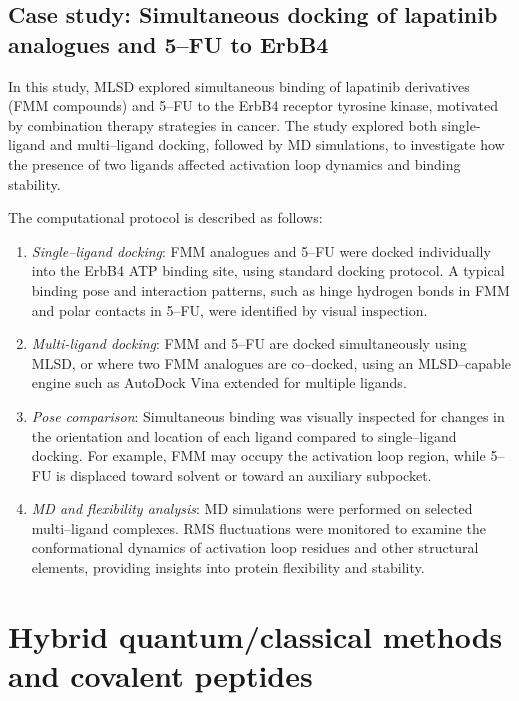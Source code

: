 \documentclass[12pt]{article}
\begin{document}
\subsection{Case study: Simultaneous docking of lapatinib analogues and 5–FU to ErbB4}

In this study, MLSD explored simultaneous binding of lapatinib derivatives (FMM compounds) and 5–FU to the ErbB4 receptor tyrosine kinase\cite{CH14_ErbB4MLSD2024}, motivated by combination therapy strategies in cancer.  The study explored both single-ligand and multi–ligand docking, followed by MD simulations, to investigate how the presence of two ligands affected activation loop dynamics and binding stability.

The computational protocol is described as follows:

\begin{enumerate}
  \item \emph{Single–ligand docking}: FMM analogues and 5–FU were docked individually into the ErbB4 ATP binding site, using standard docking protocol.  A typical binding pose and interaction patterns, such as hinge hydrogen bonds in FMM and polar contacts in 5–FU, were identified by visual inspection.
  \item \emph{Multi-ligand docking}:  FMM and 5–FU are docked simultaneously using MLSD, or where two FMM analogues are co–docked, using an MLSD–capable engine such as AutoDock Vina extended for multiple ligands.
  \item \emph{Pose comparison}: Simultaneous binding was visually inspected for changes in the orientation and location of each ligand compared to single–ligand docking.  For example, FMM may occupy the activation loop region, while 5–FU is displaced toward solvent or toward an auxiliary subpocket. 
  \item \emph{MD and flexibility analysis}: MD simulations were performed on selected multi–ligand complexes. RMS fluctuations were monitored to examine the conformational dynamics of activation loop residues and other structural elements, providing insights into protein flexibility and stability.  
\end{enumerate}


\section{Hybrid quantum/classical methods and covalent peptides}
\end{document}
